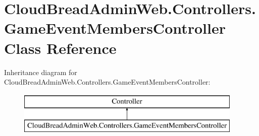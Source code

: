 \hypertarget{a00082}{}\section{Cloud\+Bread\+Admin\+Web.\+Controllers.\+Game\+Event\+Members\+Controller Class Reference}
\label{a00082}
Inheritance diagram for Cloud\+Bread\+Admin\+Web.\+Controllers.\+Game\+Event\+Members\+Controller\+:\begin{figure}[H]
\begin{center}
\leavevmode
\includegraphics[height=2.000000cm]{a00082}
\end{center}
\end{figure}
